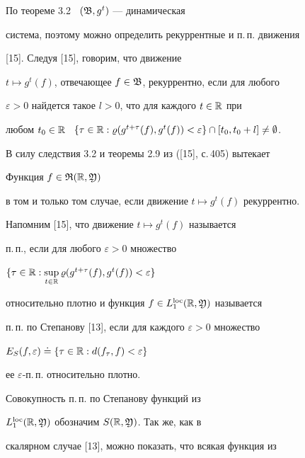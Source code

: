 По теореме 3.2 \ $(\frak B,g^t)$ --- динамическая


система, поэтому можно определить рекуррентные и п.\,п. движения


[15]. Следуя [15], говорим, что движение


$t\mapsto g^{t}(f)$, отвечающее $f\in\frak B$, рекуррентно, если для любого


$\varepsilon>0$ найдется такое $l>0$, что для каждого $t\in\Bbb R$ при


любом $t_0\in\Bbb R$ \ $\{\tau\in\Bbb R:\varrho(g^{t+\tau}(f),g^{t}(f))<


\varepsilon\}\cap[t_0,t_0+l]\ne\emptyset$.





В силу следствия 3.2 и теоремы 2.9 из ([15], с.\,405) вытекает








\begin{lems}


Функция $f\in\frak R(\Bbb R,\frak Y)$


в том и только том случае, если движение $t\mapsto g^{t}(f)$ рекуррентно.


\end{lems}





Напомним [15], что движение $t\mapsto g^{t}(f)$ называется


п.\,п., если для любого $\varepsilon>0$ множество


$\{\tau\in\Bbb R:\sup\limits_{t\in\Bbb R}


\varrho(g^{t+\tau}(f),g^t(f))<\varepsilon\}$


относительно плотно и функция $f\in L_1^{\operatorname{loc}}(\Bbb R,\frak Y)$ называется


п.\,п. по Степанову [13], если для каждого $\varepsilon>0$ множество


$E_{S}(f,\varepsilon)\doteq\{\tau\in\Bbb R:d(f_{\tau},f)<\varepsilon\}$


ее $\varepsilon$-п.\,п. относительно плотно.





Совокупность п.\,п. по Степанову функций из


$L_1^{\operatorname{loc}}(\Bbb R,\frak Y)$ обозначим $S(\Bbb R,\frak Y)$. Так же, как в


скалярном случае [13], можно показать, что всякая функция из


